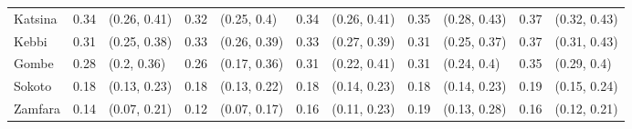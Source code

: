 \begin{tabular}{lrlrlrlrlrl}
Katsina & 0.34 & (0.26, 0.41) & 0.32 & (0.25, 0.4) & 0.34 & (0.26, 0.41) & 0.35 & (0.28, 0.43) & 0.37 & (0.32, 0.43)\\
Kebbi & 0.31 & (0.25, 0.38) & 0.33 & (0.26, 0.39) & 0.33 & (0.27, 0.39) & 0.31 & (0.25, 0.37) & 0.37 & (0.31, 0.43)\\
Gombe & 0.28 & (0.2, 0.36) & 0.26 & (0.17, 0.36) & 0.31 & (0.22, 0.41) & 0.31 & (0.24, 0.4) & 0.35 & (0.29, 0.4)\\
Sokoto & 0.18 & (0.13, 0.23) & 0.18 & (0.13, 0.22) & 0.18 & (0.14, 0.23) & 0.18 & (0.14, 0.23) & 0.19 & (0.15, 0.24)\\
Zamfara & 0.14 & (0.07, 0.21) & 0.12 & (0.07, 0.17) & 0.16 & (0.11, 0.23) & 0.19 & (0.13, 0.28) & 0.16 & (0.12, 0.21)\\
\bottomrule
\end{tabular}
